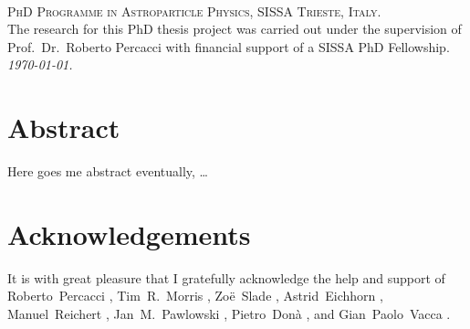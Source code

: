 \documentclass[11pt]{book} %
\numberwithin{equation}{chapter}
\begin{document}



\newpage
~\vfill
\thispagestyle{empty}

\noindent \textsc{PhD Programme in Astroparticle Physics, SISSA Trieste, Italy.}\\

\noindent The research for this PhD thesis project was carried out
under the supervision of Prof.~Dr.~Roberto Percacci with financial support
of a SISSA PhD Fellowship.\\

\noindent \textit{\monthyeardate\today.} %


\frontmatter %

\chapter*{Abstract}

\vfill
\begin{center}
  Here goes me abstract eventually, \dots
\end{center}
\vfill


\makeatletter
\@openrightfalse
\makeatother

\chapter*{Acknowledgements}

It is with great pleasure that I gratefully acknowledge the help and support
of
Roberto~Percacci%
, Tim~R.~Morris%
, Zo\"e~Slade%
, Astrid~Eichhorn%
, Manuel~Reichert%
, Jan~M.~Pawlowski%
, Pietro~Don\`a%
, and
Gian~Paolo~Vacca%
.
\end{document}
